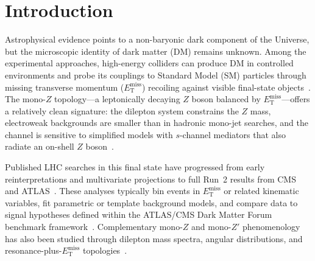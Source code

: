 \documentclass[11pt,a4paper,twocolumn]{article}
\newcommand{\GeV}{\text{GeV}}
\newcommand{\MET}{\ensuremath{E_{\mathrm{T}}^{\mathrm{miss}}}}
\begin{document}
\begin{abstract}
  ($50\le\MET<100\,\GeV$) provides an independent background
  normalisation constraint, we set observed (expected) 95\%~CL upper
  limits on the signal-strength parameter of
  $\mu<0.0177$ ($0.0018$) for the scalar mediator,
  $\mu<0.0362$ ($0.0039$) for the vector mediator, and
  $\mu<0.0498$ ($0.0069$) for the axial-vector mediator,
  corresponding to cross-section upper limits of
  $\sigma_{95}<1.76\times10^{-9}\,\mathrm{pb}$ (scalar),
  $\sigma_{95}<9.90\times10^{-4}\,\mathrm{pb}$ (vector), and
  $\sigma_{95}<9.24\times10^{-2}\,\mathrm{pb}$ and
  $7.89\times10^{-3}\,\mathrm{pb}$ (axial-vector, two benchmark points).
  The observed limits exceed the expected by factors of roughly 7--12 across all
  three mediator hypotheses and three independent background model
  variants, driven by a residual background-modelling discrepancy in
  the high-\MET\ tail ($\MET\ge100\,\GeV$, 2.4--2.5\% of SR events)
  rather than evidence of a DM signal.
  To our knowledge this is the first application of Neural Spline Flow
  likelihood-ratio scoring to a mono-$Z$ DM search on CMS open Run~2015D data
  in both the $\mu\mu$ and $ee$ channels simultaneously.
  \end{abstract}

\section{Introduction}
\label{sec:introduction}

Astrophysical evidence points to a non-baryonic dark component of the Universe, but the
microscopic identity of dark matter (DM) remains unknown.
Among the experimental approaches, high-energy colliders can produce DM in controlled
environments and probe its couplings to Standard Model (SM) particles through missing
transverse momentum ($\MET$) recoiling against visible final-state objects~\cite{Goodman2011}.
The mono-$Z$ topology---a leptonically decaying $Z$ boson balanced by $\MET$---offers a
relatively clean signature: the dilepton system constrains the $Z$ mass, electroweak
backgrounds are smaller than in hadronic mono-jet searches, and the channel is sensitive
to simplified models with $s$-channel mediators that also radiate an on-shell $Z$
boson~\cite{Bell2012,Carpenter2013,DMForum2015}.

Published LHC searches in this final state have progressed from early reinterpretations
and multivariate projections to full Run~2 results from CMS and ATLAS~\cite{Alves2015,CMS2017MonoZ,CMS2021MonoZ}.
These analyses typically bin events in $\MET$ or related kinematic variables, fit parametric
or template background models, and compare data to signal hypotheses defined within the
ATLAS/CMS Dark Matter Forum benchmark framework~\cite{DMForum2015}.
Complementary mono-$Z$ and mono-$Z'$ phenomenology has also been studied through dilepton
mass spectra, angular distributions, and resonance-plus-$\MET$ topologies~\cite{Autran2015,Altmannshofer2015,Yang2017,Elgammal2024}.
\end{document}
